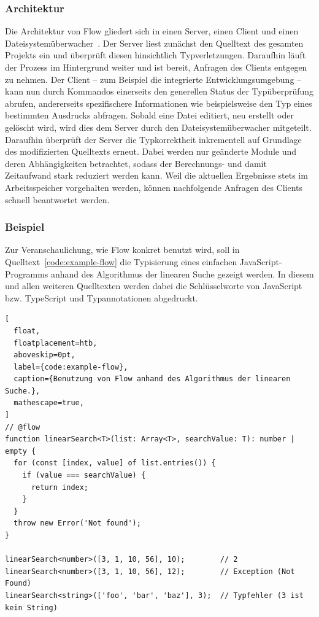 \subsubsection{Architektur}

Die Architektur von Flow gliedert sich in einen Server, einen Client und einen Dateisystemüberwacher~\autocite[22]{FLOW:PAPER}. Der Server liest zunächst den Quelltext des gesamten Projekts ein und überprüft diesen hinsichtlich Typverletzungen. Daraufhin läuft der Prozess im Hintergrund weiter und ist bereit, Anfragen des Clients entgegen zu nehmen. Der Client -- zum Beispiel die integrierte Entwicklungsumgebung -- kann nun durch Kommandos einerseits den generellen Status der Typüberprüfung abrufen, andererseits spezifischere Informationen wie beispielsweise den Typ eines bestimmten Ausdrucks abfragen. Sobald eine Datei editiert, neu erstellt oder gelöscht wird, wird dies dem Server durch den Dateisystemüberwacher mitgeteilt. Daraufhin überprüft der Server die Typkorrektheit inkrementell auf Grundlage des modifizierten Quelltexts erneut. Dabei werden nur geänderte Module und deren Abhängigkeiten betrachtet, sodass der Berechnungs- und damit Zeitaufwand stark reduziert werden kann. Weil die aktuellen Ergebnisse stets im Arbeitsspeicher vorgehalten werden, können nachfolgende Anfragen des Clients schnell beantwortet werden.

\subsubsection{Beispiel}

Zur Veranschaulichung, wie Flow konkret benutzt wird, soll in Quelltext~\ref{code:example-flow} die Typisierung eines einfachen JavaScript-Programms anhand des Algorithmus der linearen Suche gezeigt werden. In diesem und allen weiteren Quelltexten werden dabei die Schlüsselworte von JavaScript bzw. TypeScript  und Typannotationen  abgedruckt.

\begin{lstlisting}[
  float,
  floatplacement=htb,
  aboveskip=0pt,
  label={code:example-flow},
  caption={Benutzung von Flow anhand des Algorithmus der linearen Suche.},
  mathescape=true,
]
// @flow
function linearSearch<T>(list: Array<T>, searchValue: T): number | empty {
  for (const [index, value] of list.entries()) {
    if (value === searchValue) {
      return index;
    }
  }
  throw new Error('Not found');
}

linearSearch<number>([3, 1, 10, 56], 10);        // 2
linearSearch<number>([3, 1, 10, 56], 12);        // Exception (Not Found)
linearSearch<string>(['foo', 'bar', 'baz'], 3);  // Typfehler (3 ist kein String)
\end{lstlisting}

